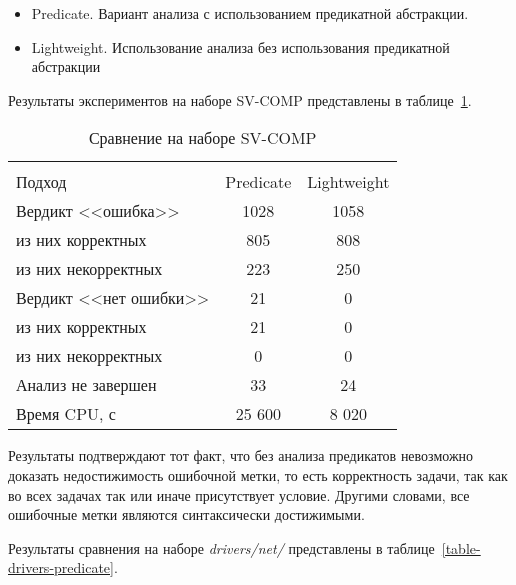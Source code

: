 \begin{itemize}
\item Predicate. Вариант анализа с использованием предикатной абстракции.
\item Lightweight. Использование анализа без использования предикатной абстракции
\end{itemize}

Результаты экспериментов на наборе SV-COMP представлены в таблице~\ref{table-svcomp-without-predicate}.

  \begin{table}[h]\footnotesize \centering
    \caption{Сравнение на наборе SV-COMP}
  	\label{table-svcomp-without-predicate}
    \begin{tabular}{ | l | c | c |}
      \hline
      		& 		\multicolumn{2}{c|}{\combatmode}  \\
      Подход         				&  Predicate	& Lightweight 		\\ \hline
      Вердикт <<ошибка>> 			& 1028   		& 1058   	\\ 
  \hspace{0.5cm} из них корректных 	& 805 			& 808 	 	\\ 
  \hspace{0.5cm} из них некорректных & 223 			& 250 	   	\\ \hline
      Вердикт <<нет ошибки>>  		& 21    		& 0     	\\ 
  \hspace{0.5cm} из них корректных 	& 21 			& 0    		\\
  \hspace{0.5cm} из них некорректных & 0 			& 0    	  	\\ \hline
      Анализ не завершен       		& 33    		& 24      	\\ \hline
      Время CPU, с   				& 25 600 		& 8 020  	\\ 
      \hline
    \end{tabular}
  \end{table}

Результаты подтверждают тот факт, что без анализа предикатов невозможно доказать недостижимость ошибочной метки, то есть корректность задачи, так как во всех задачах так или иначе присутствует условие.
Другими словами, все ошибочные метки являются синтаксически достижимыми.

Результаты сравнения на наборе \textit{drivers/net/} представлены в таблице~\ref{table-drivers-predicate}.

